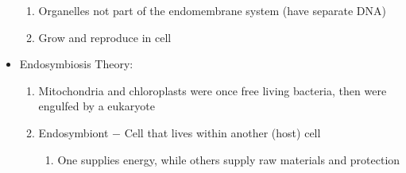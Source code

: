 \documentclass[12pt]{article}
\begin{document}
\begin{itemize}
    \begin{enumerate}

      \item Organelles not part of the endomembrane system (have separate DNA)

      \item Grow and reproduce in cell

    \end{enumerate}

  \item Endosymbiosis Theory:

    \begin{enumerate}

      \item  Mitochondria and chloroplasts were once free living bacteria, then were engulfed by a eukaryote

      \item Endosymbiont $-$ Cell that lives within another (host) cell

    \begin{enumerate}

      \item One supplies energy, while others supply raw materials and protection

    \end{enumerate}

    \end{enumerate}

\end{itemize}
\end{document}

